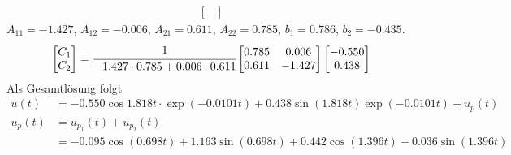 \begin{solution}
\begin{align*}
\begin{bmatrix}
        \end{bmatrix}
        \end{align*}
            $A_{11} = -1.427$,
            $A_{12} = -0.006$,
            $A_{21} = 0.611$,
            $A_{22} = 0.785$,
            $b_1 = 0.786$,
            $b_2 = -0.435$.
    \begin{align*}
        \begin{bmatrix}
            C_1 \\
            C_2
        \end{bmatrix}
        = \cfrac{1}{-1.427 \cdot 0.785 + 0.006 \cdot 0.611}
        \begin{bmatrix}
            0.785 & 0.006 \\
            0.611 & -1.427
        \end{bmatrix}
        \begin{bmatrix}
            -0.550 \\
            0.438
        \end{bmatrix}          
    \end{align*}
        Als Gesamtlösung folgt
    \begin{align*}
        u(t) &= -0.550 \cos{1.818 t} \cdot \exp(-0.0101 t) + 0.438 \sin(1.818 t) \exp(-0.0101 t) + u_p(t) \\
        u_p(t) &= u_{p_1}(t) + u_{p_2}(t) \\
        & = -0.095 \cos(0.698 t) + 1.163 \sin(0.698 t) + 0.442 \cos(1.396t) -0.036 \sin(1.396 t)
    \end{align*}
\end{solution}
